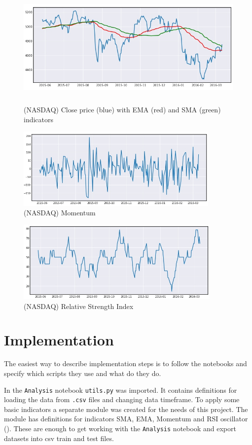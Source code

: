 \documentclass[a4paper,12pt]{article}
\begin{document}
\begin{figure}[h]
	\centering
	\includegraphics[height=6cm,width=\textwidth]{nasdaqClose}
	\caption{(NASDAQ) Close price (blue) with EMA (red) and SMA (green) indicators}
\end{figure}
\begin{figure}[h]
	\centering
	\includegraphics[height=4cm,width=\textwidth]{nasdaqMom}
	\caption{(NASDAQ) Momentum}
\end{figure}
\begin{figure}[h]
	\centering
	\includegraphics[height=4cm,width=\textwidth]{nasdaqRSI}
	\caption{(NASDAQ) Relative Strength Index}
\end{figure}

\section{Implementation}
The easiest way to describe implementation steps is to follow the notebooks and specify which scripts they use and what do they do.

In the \texttt{Analysis} notebook \texttt{utils.py} was imported. It contains definitions for loading the data from \texttt{.csv} files and changing data timeframe. To apply some basic indicators a separate module was created for the needs of this project. The module has definitions for indicators SMA, EMA, Momentum and RSI oscillator (\cite{Indicies}). These are enough to get working with the \texttt{Analysis} notebook and export datasets into csv train and test files.
\end{document}
